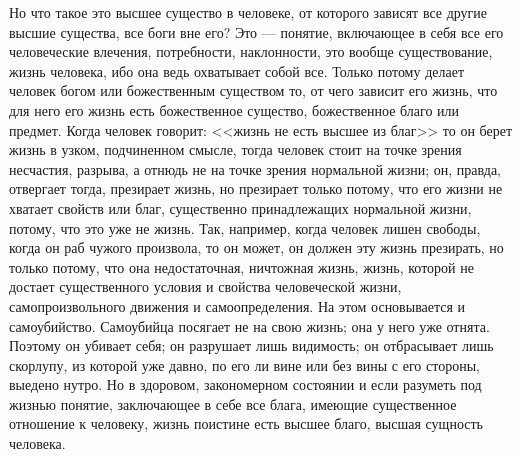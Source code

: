 \documentclass[12pt]{article}
\begin{document}
Но что такое это высшее существо в человеке, от которого зависят все другие высшие существа, все боги вне его? Это --- понятие, включающее в себя все его человеческие влечения, потребности, наклонности, это вообще существование, жизнь человека, ибо она ведь охватывает собой все. Только потому делает человек богом или божественным существом то, от чего зависит его жизнь, что для него его жизнь есть божественное существо, божественное благо или предмет. Когда человек говорит: <<жизнь не есть высшее из благ>>  то он берет жизнь в узком, подчиненном смысле, тогда человек стоит на точке зрения несчастия, разрыва, а отнюдь не на точке зрения нормальной жизни; он, правда, отвергает тогда, презирает жизнь, но презирает только потому, что его жизни не хватает свойств или благ, существенно принадлежащих нормальной жизни, потому, что это уже не жизнь. Так, например, когда человек лишен свободы, когда он раб чужого произвола, то он может, он должен эту жизнь презирать, но только потому, что она недостаточная, ничтожная жизнь, жизнь, которой не достает существенного условия и свойства человеческой жизни, самопроизвольного движения и самоопределения. На этом основывается и самоубийство. Самоубийца посягает не на свою жизнь; она у него уже отнята. Поэтому он убивает себя; он разрушает лишь видимость; он отбрасывает лишь скорлупу, из которой уже давно, по его ли вине или без вины с его стороны, выедено нутро. Но в здоровом, закономерном состоянии и если разуметь под жизнью понятие, заключающее в себе все блага, имеющие существенное отношение к человеку, жизнь поистине есть высшее благо, высшая сущность человека. 
\end{document}
